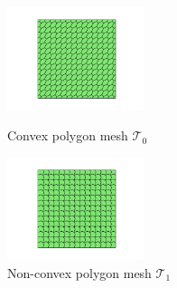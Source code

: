 \documentclass[notheorems,serif]{beamer}
\begin{document}
\begin{CJK}{UTF8}{gkai}
\begin{frame}
\begin{figure}[htbp]
\centering
\begin{minipage}[t]{0.49\linewidth}
\centering
\includegraphics[width=4cm]{../figures/convex.pdf}
\caption{Convex polygon mesh $\mathcal T_0$}
\end{minipage}%
\begin{minipage}[t]{0.49\linewidth}
\centering
\includegraphics[width=4cm]{../figures/nonconvex.pdf}
\caption{Non-convex polygon mesh $\mathcal T_1$}
\end{minipage}%
\centering
\end{figure}

\end{frame}


\end{CJK}
\end{document}
